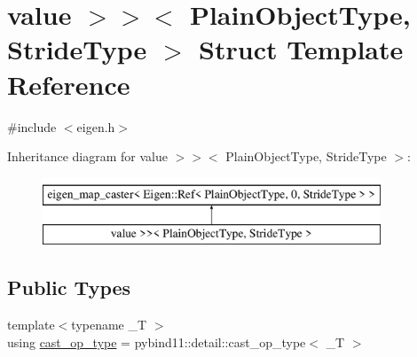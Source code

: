 \hypertarget{structtype__caster_3_01_eigen_1_1_ref_3_01_plain_object_type_00_010_00_01_stride_type_01_4_00_014483c445e66b0d8d9bb7fc2aa837ecac}{}\section{value $>$$>$$<$ Plain\+Object\+Type, Stride\+Type $>$ Struct Template Reference}
\label{structtype__caster_3_01_eigen_1_1_ref_3_01_plain_object_type_00_010_00_01_stride_type_01_4_00_014483c445e66b0d8d9bb7fc2aa837ecac}


{\ttfamily \#include $<$eigen.\+h$>$}

Inheritance diagram for value $>$$>$$<$ Plain\+Object\+Type, Stride\+Type $>$\+:\begin{figure}[H]
\begin{center}
\leavevmode
\includegraphics[height=2.000000cm]{structtype__caster_3_01_eigen_1_1_ref_3_01_plain_object_type_00_010_00_01_stride_type_01_4_00_014483c445e66b0d8d9bb7fc2aa837ecac}
\end{center}
\end{figure}
\subsection*{Public Types}
\begin{DoxyCompactItemize}
\item 
{\footnotesize template$<$typename \+\_\+T $>$ }\\using \mbox{\hyperlink{structtype__caster_3_01_eigen_1_1_ref_3_01_plain_object_type_00_010_00_01_stride_type_01_4_00_014483c445e66b0d8d9bb7fc2aa837ecac_a8508add2dda883fb545f1dd99f308f9e}{cast\+\_\+op\+\_\+type}} = pybind11\+::detail\+::cast\+\_\+op\+\_\+type$<$ \+\_\+T $>$
\end{DoxyCompactItemize}
